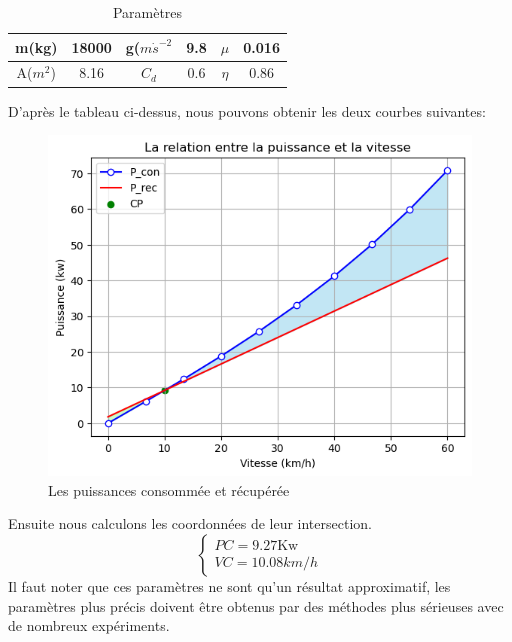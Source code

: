 \documentclass[lettersize,journal]{IEEEtran}
\begin{document}
\begin{table}[H]
    \centering
    \begin{tabular}{c|c|c|c|c|c}
    
    \hline
         m(kg)& 18000 & g($m\dot s^{-2}$ & 9.8 & $\mu$ & 0.016 \\
    \hline
         A($m^{2}$)& 8.16 & $C_d$ & 0.6 & $\eta$  & 0.86\\
         \hline
    \end{tabular}
    \caption{Paramètres}
    \label{tab:my_label}
\end{table}

D'après le tableau ci-dessus, nous pouvons obtenir les deux courbes suivantes:
\begin{figure}[H]
\centering
 \includegraphics[width=0.7\linewidth]{CP.png}
\caption{Les puissances consommée et récupérée}
\end{figure}
Ensuite nous calculons les coordonnées de leur intersection.
\begin{equation}
    \begin{cases}
        PC = 9.27 \text{Kw} \\
        VC = 10.08 km /h
    \end{cases}
\end{equation}
Il faut noter que ces paramètres ne sont qu'un résultat approximatif, les paramètres plus précis doivent être obtenus par des méthodes plus sérieuses avec de nombreux expériments.
\end{document}
